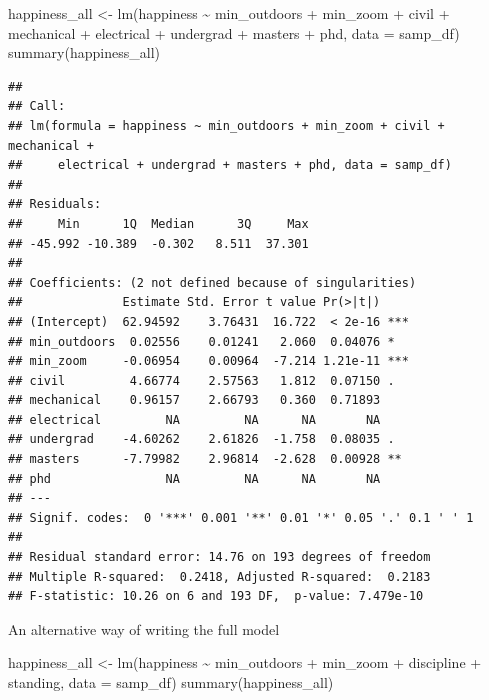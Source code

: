 \documentclass[
]{book}
\newenvironment{Shaded}{\begin{snugshade}}{\end{snugshade}}
\newcommand{\AttributeTok}[1]{\textcolor[rgb]{0.77,0.63,0.00}{#1}}
\newcommand{\FunctionTok}[1]{\textcolor[rgb]{0.00,0.00,0.00}{#1}}
\newcommand{\NormalTok}[1]{#1}
\newcommand{\OtherTok}[1]{\textcolor[rgb]{0.56,0.35,0.01}{#1}}
\newcommand{\SpecialCharTok}[1]{\textcolor[rgb]{0.00,0.00,0.00}{#1}}
\begin{document}
\begin{Shaded}
\begin{Highlighting}[]
\NormalTok{happiness\_all }\OtherTok{\textless{}{-}} \FunctionTok{lm}\NormalTok{(happiness }\SpecialCharTok{\textasciitilde{}}\NormalTok{ min\_outdoors }\SpecialCharTok{+}\NormalTok{ min\_zoom }\SpecialCharTok{+}\NormalTok{ civil }\SpecialCharTok{+}\NormalTok{ mechanical }\SpecialCharTok{+}\NormalTok{ electrical }\SpecialCharTok{+}\NormalTok{ undergrad }\SpecialCharTok{+}\NormalTok{ masters }\SpecialCharTok{+}\NormalTok{ phd, }\AttributeTok{data =}\NormalTok{ samp\_df)}
\FunctionTok{summary}\NormalTok{(happiness\_all)}
\end{Highlighting}
\end{Shaded}

\begin{verbatim}
## 
## Call:
## lm(formula = happiness ~ min_outdoors + min_zoom + civil + mechanical + 
##     electrical + undergrad + masters + phd, data = samp_df)
## 
## Residuals:
##     Min      1Q  Median      3Q     Max 
## -45.992 -10.389  -0.302   8.511  37.301 
## 
## Coefficients: (2 not defined because of singularities)
##              Estimate Std. Error t value Pr(>|t|)    
## (Intercept)  62.94592    3.76431  16.722  < 2e-16 ***
## min_outdoors  0.02556    0.01241   2.060  0.04076 *  
## min_zoom     -0.06954    0.00964  -7.214 1.21e-11 ***
## civil         4.66774    2.57563   1.812  0.07150 .  
## mechanical    0.96157    2.66793   0.360  0.71893    
## electrical         NA         NA      NA       NA    
## undergrad    -4.60262    2.61826  -1.758  0.08035 .  
## masters      -7.79982    2.96814  -2.628  0.00928 ** 
## phd                NA         NA      NA       NA    
## ---
## Signif. codes:  0 '***' 0.001 '**' 0.01 '*' 0.05 '.' 0.1 ' ' 1
## 
## Residual standard error: 14.76 on 193 degrees of freedom
## Multiple R-squared:  0.2418, Adjusted R-squared:  0.2183 
## F-statistic: 10.26 on 6 and 193 DF,  p-value: 7.479e-10
\end{verbatim}

An alternative way of writing the full model

\begin{Shaded}
\begin{Highlighting}[]
\NormalTok{happiness\_all }\OtherTok{\textless{}{-}} \FunctionTok{lm}\NormalTok{(happiness }\SpecialCharTok{\textasciitilde{}}\NormalTok{ min\_outdoors }\SpecialCharTok{+}\NormalTok{ min\_zoom }\SpecialCharTok{+}\NormalTok{ discipline }\SpecialCharTok{+}\NormalTok{ standing, }\AttributeTok{data =}\NormalTok{ samp\_df)}
\FunctionTok{summary}\NormalTok{(happiness\_all)}
\end{Highlighting}
\end{Shaded}
\end{document}
